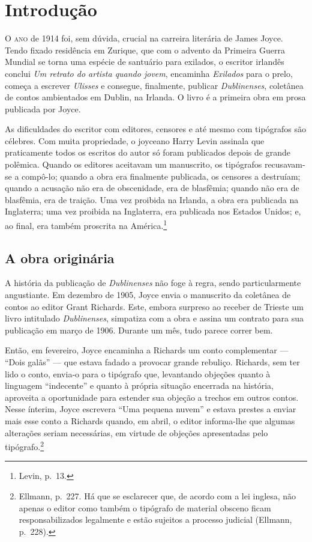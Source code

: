 
\chapter[Introdução, por José Roberto O’Shea]{Introdução}

\textsc{O ano} de 1914 foi, sem dúvida, crucial na carreira literária de James
Joyce. Tendo fixado residência em Zurique, que com o advento da Primeira Guerra
Mundial se torna uma espécie de santuário para exilados, o escritor irlandês
conclui \textit{Um retrato do artista quando jovem}, encaminha \textit{Exilados} para o
prelo, começa a escrever \textit{Ulisses} e consegue, finalmente, publicar
\textit{Dublinenses}, coletânea de contos ambientados em Dublin, na Irlanda. O
livro é a primeira obra em prosa publicada por Joyce.

As dificuldades do escritor com editores, censores e até mesmo com tipógrafos
são célebres. Com muita propriedade, o joyceano Harry Levin assinala que
praticamente todos os escritos do autor só foram publicados depois de grande
polêmica. Quando os editores aceitavam um manuscrito, os tipógrafos
recusavam-se a compô-lo; quando a obra era finalmente publicada, os censores a
destruíam; quando a acusação não era de obscenidade, era de blasfêmia; quando
não era de blasfêmia, era de traição.  Uma vez proibida na Irlanda, a obra era
publicada na Inglaterra; uma vez proibida na Inglaterra, era publicada nos
Estados Unidos; e, ao final, era também proscrita na América.\footnote{ Levin, p.~13.}

\section{A obra originária}

A história da publicação de \textit{Dublinenses} não foge à regra, sendo
particularmente angustiante. Em dezembro de 1905, Joyce envia o manuscrito da
coletânea de contos ao editor Grant Richards. Este, embora surpreso ao receber
de Trieste um livro intitulado \textit{Dublinenses}, simpatiza com a obra e
assina um contrato para sua publicação em março de 1906. Durante um mês, tudo
parece correr bem.

Então, em fevereiro, Joyce encaminha a Richards um conto complementar --- “Dois
galãs” --- que estava fadado a provocar grande rebuliço. Richards, sem ter lido o
conto, envia-o para o tipógrafo que, levantando objeções quanto à linguagem
“indecente” e quanto à própria situação encerrada na história, aproveita a
oportunidade para estender sua objeção a trechos em outros contos. Nesse
ínterim, Joyce escrevera “Uma pequena nuvem” e estava prestes a enviar mais
esse conto a Richards quando, em abril, o editor informa-lhe que algumas
alterações seriam necessárias, em virtude de objeções apresentadas pelo
tipógrafo.\footnote{  Ellmann, p.~227. Há que se esclarecer que, de acordo com a
lei inglesa, não apenas o editor como também o tipógrafo de material obsceno
ficam responsabilizados legalmente e estão sujeitos a processo judicial
(Ellmann, p.~228).}

